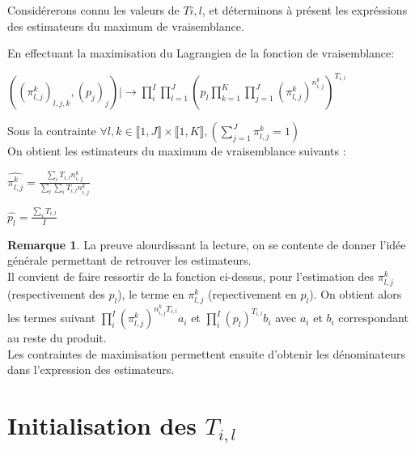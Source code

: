 \documentclass[frenchb]{report}
\newcommand{\1}{\mathbbm{1}}
\theoremstyle{definition}\newtheorem{defn}{Définition}
\theoremstyle{definition}\newtheorem{exm}{Exemple}
\theoremstyle{definition}\newtheorem{nota}{Notation}
\theoremstyle{definition}\newtheorem{rem}{Remarque}
\begin{document}
\newpage

Considérerons connu les valeurs de $T{i,l}$, et déterminons à présent les expréssions des estimateurs du maximum de vraisemblance.
\bigskip

En effectuant la maximisation du Lagrangien de la fonction de vraisemblance: 

\begin{center}
	$\left( \left(\pi^k_{l,j}\right)_{l,j,k},(p_j)_j \right) |  \!\!\! \longrightarrow \displaystyle \prod_i^I \displaystyle \prod_{l=1}^J \left( p_l \displaystyle \prod_{k=1}^K \displaystyle \prod_{j = 1}^J \left(\pi^k_{l,j}\right)^{n^k_{i,j}} \right)^{T_{i,l}}$
\end{center}

Sous la contrainte $\forall l,k \in  \llbracket 1,J \rrbracket \times  \llbracket 1,K \rrbracket, \left(\displaystyle \sum_{j = 1}^J \pi^k_{l,j} = 1 \right)$\\

On obtient les estimateurs du maximum de vraisemblance suivants : \\

\begin{center} 
	$\widehat{\pi^{k}_{l,j}} = \displaystyle \frac{\displaystyle \sum_i T_{i,l} n^k_{i,j}}{\displaystyle \sum_l \displaystyle \sum_i T_{i,l} n^k_{i,j}}$
\end{center}
\begin{center}
	$\widehat{p_l} = \displaystyle \frac{\displaystyle \sum_i T_{i,l}}{I}$
\end{center}

\begin{rem}
	La preuve alourdissant la lecture, on se contente de donner l'idée générale permettant de retrouver les estimateurs. \\
Il convient de faire ressortir de la fonction ci-dessus, pour l'estimation des $\pi^k_{l,j}$ (respectivement des $p_l$), le terme en $\pi^k_{l,j}$ (repectivement en $p_l$). On obtient alors les termes suivant $\displaystyle \prod_i^I \left(\pi^k_{l,j}\right)^{n^k_{i,j}T_{i,l}} a_i$ et $\displaystyle \prod_i^I (p_l)^{T_{i,l}} b_i$ avec $a_i$ et $b_i$ correspondant au reste du produit.\\
Les contraintes de maximisation permettent ensuite d'obtenir les dénominateurs dans l'expression des estimateurs. 
\end{rem}
\bigskip
\bigskip
\bigskip





\section{Initialisation des $T_{i,l}$}
\end{document}
